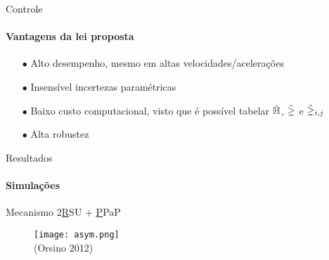 \documentclass[25pt,landscape]{beamer}
\begin{document}
\begin{frame}{Controle}
    \framesubtitle{Vantagens da lei proposta}
    \begin{block}{}
    	\begin{itemize}
    		\pause
			\item[$\bullet$] Alto desempenho, mesmo em altas velocidades/acelera\c{c}\~oes \\[8pt]
			\pause
			\item[$\bullet$] Insens\'ivel incertezas param\'etricas \\[8pt]
			\pause
			\item[$\bullet$] Baixo custo computacional, visto que \'e poss\'ivel tabelar $\hat{\mathbb{H}}$, $\hat{\mathbb{\gamma}}$ e $\hat{\mathbb{\gamma}}_{i,j}$\\[8pt]
			\pause
			\item[$\bullet$] Alta robustez \\[8pt]
		\end{itemize}
    \end{block}
\end{frame}

\begin{frame}{Resultados}
	\framesubtitle{Simula\c{c}\~oes}
	\pause
	\begin{block}{Mecanismo}
		2\underline{R}SU + \underline{P}PaP
	\end{block}
	\begin{figure}[!h]
        \centering
        \texttt{[image: asym.png]} \\
        (Orsino 2012)
    \end{figure}
\end{frame}
\end{document}
